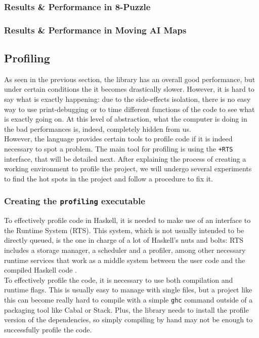 \subsubsection{Results \& Performance in 8-Puzzle}

\subsubsection{Results \& Performance in Moving AI Maps}


\subsection{Profiling}

As seen in the previous section, the library has an overall good performance,
but under certain conditions the it becomes drastically slower. However, it is
hard to say what is exactly happening: due to the side-effects isolation, there
is no easy way to use print-debugging or to time different functions of the
code to see what is exactly going on. At this level of abstraction, what the
computer is doing in the bad performances is, indeed, completely hidden from
us.\\

However, the language provides certain tools to profile code if it is indeed
necessary to spot a problem. The main tool for profiling is using the
\texttt{+RTS} interface, that will be detailed next. After explaining the
process of creating a working environment to profile the project, we will
undergo several experiments to find the hot spots in the project and follow a
procedure to fix it.\\

\subsubsection{Creating the \texttt{profiling} executable}

To effectively profile code in Haskell, it is needed to make use of an
interface to the Runtime System (RTS). This system, which is not usually
intended to be directly queued, is the one in charge of a lot of Haskell's nuts
and bolts: RTS includes a storage manager, a scheduler and a profiler, among
other necessary runtime services that work as a middle system between the user
code and the compiled Haskell code \cite{ghc}.\\

To effectively profile the code, it is necessary to use both compilation and
runtime flags. This is usually easy to manage with single files, but a project
like this can become really hard to compile with a simple \texttt{ghc} command
outside of a packaging tool like Cabal or Stack. Plus, the library needs to
install the profile version of the dependencies, so simply compiling by hand
may not be enough to successfully profile the code.\\

